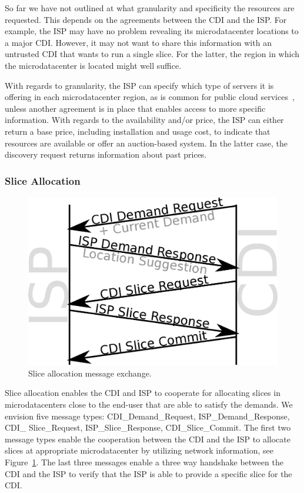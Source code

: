 So far we have not outlined at what granularity and specificity the resources
are requested. This depends on the agreements between the CDI and the ISP.  For
example, the ISP may have no problem revealing its microdatacenter locations to
a major CDI. However, it may not want to share this information with an
untrusted CDI that wants to run a single slice. For the latter, the region in
which the microdatacenter is located might well suffice.

With regards to granularity, the ISP can specify which type of servers it is
offering in each microdatacenter region, as is common for public cloud
services~\cite{amazon}, unless another agreement is in place that enables
access to more specific information.  With regards to the availability and/or
price, the ISP can either return a base price, including installation and usage
cost, to indicate that resources are available or offer an auction-based
system. In the latter case, the discovery request returns information about
past prices.

\subsubsection{Slice Allocation}\label{sec:system-slice-allocation}

\begin{figure}
    \begin{center}
    \includegraphics[width=0.6\linewidth]{figures/Resource_Negotiation.eps}
    \end{center}
    \vspace*{-1em}
    \caption{Slice allocation message exchange.}
    \label{fig:ResourceAllocation}
\end{figure}

Slice allocation enables the CDI and ISP to cooperate for allocating slices in
microdatacenters close to the end-user that are able to satisfy the demands.
We envision five message types: CDI\_Demand\_Request, ISP\_Demand\_Response,
CDI\_ Slice\_Request, ISP\_Slice\_Response, CDI\_Slice\_Commit. The first two
message types enable the cooperation between the CDI and the ISP to allocate
slices at appropriate microdatacenter by utilizing network information, see
Figure~\ref{fig:ResourceAllocation}. The last three messages enable a three way
handshake between the CDI and the ISP to verify that the ISP is able to provide
a specific slice for the CDI.

